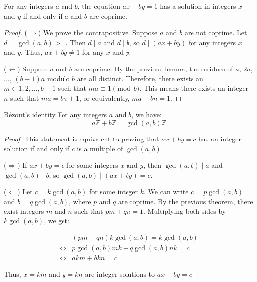 \documentclass{article}
\begin{document}
\begin{theorem}{}{}
For any integers $a$ and $b$, the equation $ax + by = 1$ has a solution in integers $x$ and $y$ if and only if $a$ and $b$ are coprime.
\end{theorem}
\begin{proof}
($\Rightarrow$) We prove the contrapositive. Suppose $a$ and $b$ are not coprime. Let $d = \gcd(a,b) > 1$. Then $d \mid a$ and $d \mid b$, so $d \mid (ax + by)$ for any integers $x$ and $y$. Thus, $ax + by \neq 1$ for any $x$ and $y$.

($\Leftarrow$) Suppose $a$ and $b$ are coprime. By the previous lemma, the residues of $a$, $2a$, ..., $(b-1)a$ modulo $b$ are all distinct. Therefore, there exists an $m \in {1, 2, ..., b-1}$ such that $ma \equiv 1 \pmod{b}$. This means there exists an integer $n$ such that $ma = bn + 1$, or equivalently, $ma - bn = 1$.
\end{proof}

\begin{theorem}{Bézout's identity}{}
For any integers $a$ and $b$, we have:
    \begin{equation}
        a\mathbb{Z} + b \mathbb{Z} = \gcd(a, b)\mathbb{Z}
    \end{equation}
\end{theorem}

\begin{proof}
This statement is equivalent to proving that $ax + by = c$ has an integer solution if and only if $c$ is a multiple of $\gcd(a,b)$.

($\Rightarrow$) If $ax + by = c$ for some integers $x$ and $y$, then $\gcd(a,b) \mid a$ and $\gcd(a,b) \mid b$, so $\gcd(a,b) \mid (ax + by) = c$.

($\Leftarrow$) Let $c = k\gcd(a,b)$ for some integer $k$. We can write $a = p\gcd(a,b)$ and $b = q\gcd(a,b)$, where $p$ and $q$ are coprime. By the previous theorem, there exist integers $m$ and $n$ such that $pm + qn = 1$. Multiplying both sides by $k\gcd(a,b)$, we get:

\begin{align*}
    &(pm + qn)k\gcd(a, b) = k \gcd(a, b) \\
    \iff& p \gcd(a, b) mk + q \gcd(a, b) nk = c \\
    \iff& akm + bkn = c
\end{align*}

Thus, $x = km$ and $y = kn$ are integer solutions to $ax + by = c$.
\end{proof}
\end{document}
